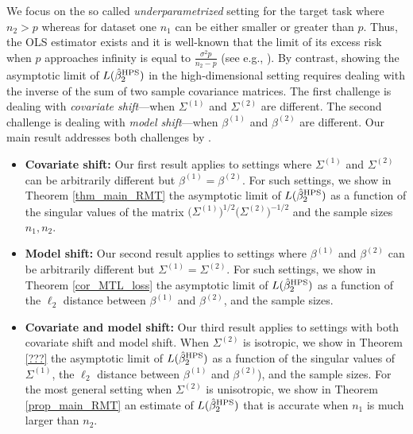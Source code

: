 We focus on the so called \textit{underparametrized} setting for the target task where $n_2 > p$ whereas for dataset one $n_1$ can be either smaller or greater than $p$.
Thus, the OLS estimator exists and it is well-known that the limit of its excess risk when $p$ approaches infinity is equal to $\frac{\sigma^2 p}{n_2 - p}$ (see e.g., \citet{bai2009spectral}).
By contrast, showing the asymptotic limit of $L(\hat{\beta}^{\textup{HPS}}_2)$ in the high-dimensional setting requires dealing with the inverse of the sum of two sample covariance matrices.
The first challenge is dealing with \textit{covariate shift}---when $\Sigma^{(1)}$ and $\Sigma^{(2)}$ are different.
The second challenge is dealing with \textit{model shift}---when $\beta^{(1)}$ and $\beta^{(2)}$ are different.
Our main result addresses both challenges by .
\begin{itemize}
    \item \textbf{Covariate shift:}
    Our first result applies to settings where $\Sigma^{(1)}$ and $\Sigma^{(2)}$ can be arbitrarily different but $\beta^{(1)} = \beta^{(2)}$.
    For such settings, we show in Theorem \ref{thm_main_RMT} the asymptotic limit of $L(\hat{\beta}_2^{\textup{HPS}})$ as a function of the singular values of the matrix $\big(\Sigma^{(1)}\big)^{1/2}\big(\Sigma^{(2)}\big)^{-1/2}$ and the sample sizes $n_1, n_2$.
    \item \textbf{Model shift:} Our second result applies to settings where $\beta^{(1)}$ and $\beta^{(2)}$ can be arbitrarily different but $\Sigma^{(1)} = \Sigma^{(2)}$.
    For such settings, we show in Theorem \ref{cor_MTL_loss} the asymptotic limit of $L(\hat{\beta}_2^{\textup{HPS}})$ as a function of the $\ell_2$ distance between $\beta^{(1)}$ and $\beta^{(2)}$, and the sample sizes.
    \item \textbf{Covariate and model shift:} Our third result applies to settings with both covariate shift and model shift.
    When $\Sigma^{(2)}$ is isotropic, we show in Theorem \ref{???} the asymptotic limit of $L(\hat{\beta}_2^{\textup{HPS}})$ as a function of the singular values of $\Sigma^{(1)}$, the $\ell_2$ distance between $\beta^{(1)}$ and $\beta^{(2)}$), and the sample sizes.
    For the most general setting when $\Sigma^{(2)}$ is unisotropic, we show in Theorem \ref{prop_main_RMT} an estimate of $L(\hat{\beta}_2^{\textup{HPS}})$ that is accurate when $n_1$ is much larger than $n_2$.
\end{itemize}

